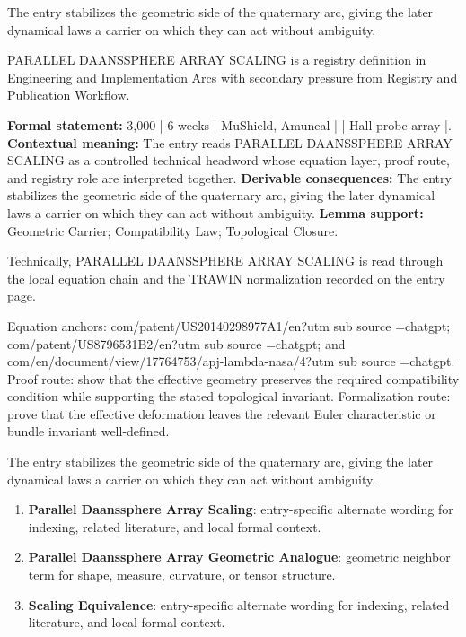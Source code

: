 The entry stabilizes the geometric side of the quaternary arc, giving the later dynamical laws a carrier on which they can act without ambiguity.
\clearpage


\begingroup\small
{}
PARALLEL DAANSSPHERE ARRAY SCALING is a registry definition in Engineering and Implementation Arcs with secondary pressure from Registry and Publication Workflow.

\begingroup\footnotesize\setlength{\emergencystretch}{3em}\sloppy
\textbf{Formal statement:} 3,000 | 6 weeks | MuShield, Amuneal | | Hall probe array |. \textbf{Contextual meaning:} The entry reads PARALLEL DAANSSPHERE ARRAY SCALING as a controlled technical headword whose equation layer, proof route, and registry role are interpreted together. \textbf{Derivable consequences:} The entry stabilizes the geometric side of the quaternary arc, giving the later dynamical laws a carrier on which they can act without ambiguity. \textbf{Lemma support:} Geometric Carrier; Compatibility Law; Topological Closure.\par
\endgroup

Technically, PARALLEL DAANSSPHERE ARRAY SCALING is read through the local equation chain and the TRAWIN normalization recorded on the entry page.

Equation anchors: com/patent/US20140298977A1/en?utm sub source =chatgpt; com/patent/US8796531B2/en?utm sub source =chatgpt; and com/en/document/view/17764753/apj-lambda-nasa/4?utm sub source =chatgpt. Proof route: show that the effective geometry preserves the required compatibility condition while supporting the stated topological invariant. Formalization route: prove that the effective deformation leaves the relevant Euler characteristic or bundle invariant well-defined.

The entry stabilizes the geometric side of the quaternary arc, giving the later dynamical laws a carrier on which they can act without ambiguity.
\endgroup

\begin{enumerate}[leftmargin=1.6em,itemsep=6pt,topsep=4pt]
\item \textbf{Parallel Daanssphere Array Scaling}: entry-specific alternate wording for indexing, related literature, and local formal context.
\item \textbf{Parallel Daanssphere Array Geometric Analogue}: geometric neighbor term for shape, measure, curvature, or tensor structure.
\item \textbf{Scaling Equivalence}: entry-specific alternate wording for indexing, related literature, and local formal context.
\end{enumerate}

